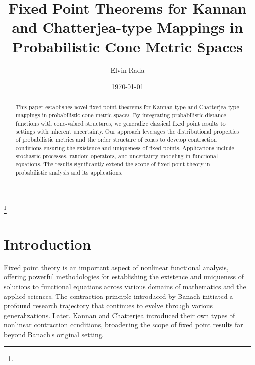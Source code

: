 \documentclass{amsart}
\theoremstyle{definition}
\theoremstyle{remark}
\numberwithin{equation}{section}
\begin{document}
\title[Fixed Point Theorems in Probabilistic Cone Metric Spaces] {Fixed Point Theorems for Kannan and Chatterjea-type Mappings in Probabilistic Cone Metric Spaces}


\author[E. Rada]{Elvin Rada}
\address{Department of Mathematics, Faculty of Natural Sciences, University of Elbasan "Aleksandër Xhuvani", Albania}
\curraddr{}
\thanks{}




\date{\today}

\dedicatory{}

\begin{abstract}
	This paper establishes novel fixed point theorems for Kannan-type and Chatterjea-type mappings in probabilistic cone metric spaces. By integrating probabilistic distance functions with cone-valued structures, we generalize classical fixed point results to settings with inherent uncertainty. Our approach leverages the distributional properties of probabilistic metrics and the order structure of cones to develop contraction conditions ensuring the existence and uniqueness of fixed points. Applications include stochastic processes, random operators, and uncertainty modeling in functional equations. The results significantly extend the scope of fixed point theory in probabilistic analysis and its applications.
\end{abstract}

\maketitle
 

\section{Introduction}
Fixed point theory is an important aspect of nonlinear functional analysis, offering powerful methodologies for establishing the existence and uniqueness of solutions to functional equations across various domains of mathematics and the applied sciences. The contraction principle introduced by Banach \cite{Banach1922} initiated a profound research trajectory that continues to evolve through various generalizations. Later, Kannan \cite{Kannan1968} and Chatterjea \cite{Chatterjea1972} introduced their own types of nonlinear contraction conditions, broadening the scope of fixed point results far beyond Banach’s original setting.
\end{document}
